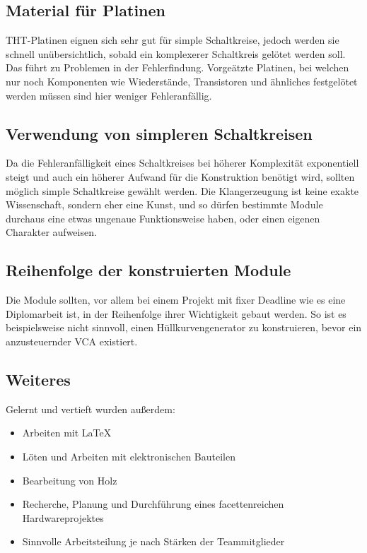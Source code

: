 \subsection{Material für Platinen}
\label{sec:orgba73fca}
THT-Platinen eignen sich sehr gut für simple Schaltkreise, jedoch werden sie schnell unübersichtlich, sobald ein komplexerer Schaltkreis gelötet werden soll. Das führt zu Problemen in der Fehlerfindung. Vorgeätzte Platinen, bei welchen nur noch Komponenten wie Wiederstände, Transistoren und ähnliches festgelötet werden müssen sind hier weniger Fehleranfällig.

\subsection{Verwendung von simpleren Schaltkreisen}
\label{sec:org4515653}
Da die Fehleranfälligkeit eines Schaltkreises bei höherer Komplexität exponentiell steigt und auch ein höherer Aufwand für die Konstruktion benötigt wird, sollten möglich simple Schaltkreise gewählt werden. Die Klangerzeugung ist keine exakte Wissenschaft, sondern eher eine Kunst, und so dürfen bestimmte Module durchaus eine etwas ungenaue Funktionsweise haben, oder einen eigenen Charakter aufweisen.

\subsection{Reihenfolge der konstruierten Module}
\label{sec:org70fa7e3}
Die Module sollten, vor allem bei einem Projekt mit fixer Deadline wie es eine Diplomarbeit ist, in der Reihenfolge ihrer Wichtigkeit gebaut werden. So ist es beispielsweise nicht sinnvoll, einen Hüllkurvengenerator zu konstruieren, bevor ein anzusteuernder \ac{VCA} existiert.

\subsection{Weiteres}
\label{sec:org1fd00d7}
Gelernt und vertieft wurden außerdem:
\begin{itemize}
\item Arbeiten mit \LaTeX
\item Löten und Arbeiten mit elektronischen Bauteilen
\item Bearbeitung von Holz
\item Recherche, Planung und Durchführung eines facettenreichen Hardwareprojektes
\item Sinnvolle Arbeitsteilung je nach Stärken der Teammitglieder
\end{itemize}

